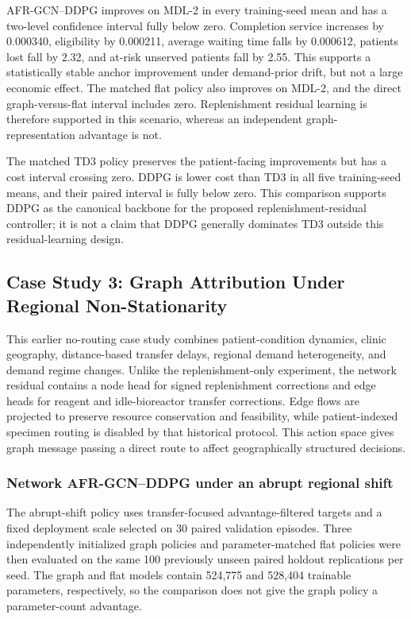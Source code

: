 \documentclass[preprint,review,12pt]{elsarticle}
\begin{document}
AFR-GCN--DDPG improves on MDL-2 in every training-seed mean and has a
two-level confidence interval fully below zero. Completion service increases
by 0.000340, eligibility by 0.000211, average waiting time falls by 0.000612,
patients lost fall by 2.32, and at-risk unserved patients fall by 2.55. This
supports a statistically stable anchor improvement under demand-prior drift,
but not a large economic effect. The matched flat policy also improves on
MDL-2, and the direct graph-versus-flat interval includes zero. Replenishment
residual learning is therefore supported in this scenario, whereas an
independent graph-representation advantage is not.

The matched TD3 policy preserves the patient-facing improvements but has a
cost interval crossing zero. DDPG is lower cost than TD3 in all five
training-seed means, and their paired interval is fully below zero. This
comparison supports DDPG as the canonical backbone for the proposed
replenishment-residual controller; it is not a claim that DDPG generally
dominates TD3 outside this residual-learning design.

\subsection{Case Study 3: Graph Attribution Under Regional Non-Stationarity}
\label{subsec:casestudy3}

This earlier no-routing case study combines patient-condition dynamics, clinic geography,
distance-based transfer delays, regional demand heterogeneity, and demand
regime changes. Unlike the replenishment-only experiment, the network residual
contains a node head for signed replenishment corrections and edge heads for
reagent and idle-bioreactor transfer corrections. Edge flows are projected to
preserve resource conservation and feasibility, while patient-indexed specimen
routing is disabled by that historical protocol. This action space gives graph message passing a direct route to
affect geographically structured decisions.

\subsubsection{Network AFR-GCN--DDPG under an abrupt regional shift}

The abrupt-shift policy uses transfer-focused advantage-filtered targets and a
fixed deployment scale selected on 30 paired validation episodes. Three
independently initialized graph policies and parameter-matched flat policies
were then evaluated on the same 100 previously unseen paired holdout
replications per seed. The graph and flat models contain 524,775 and 528,404
trainable parameters, respectively, so the comparison does not give the graph
policy a parameter-count advantage.
\end{document}
